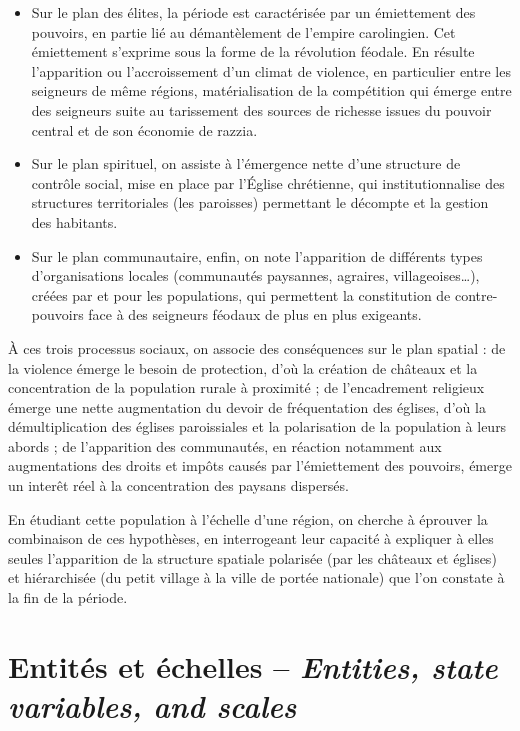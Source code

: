 \begin{itemize}
	\item Sur le plan des élites, la période est caractérisée par un émiettement des pouvoirs, en partie lié au démantèlement de l'empire carolingien.
	Cet émiettement s'exprime sous la forme de la \og révolution féodale\fg{}.
	En résulte l'apparition ou l'accroissement d'un climat de violence, en particulier entre les seigneurs de même régions, matérialisation de la compétition qui émerge entre des seigneurs suite au tarissement des sources de richesse issues du pouvoir central et de son économie de razzia.
	\item Sur le plan spirituel, on assiste à l'émergence nette d'une structure de contrôle social, mise en place par l'Église chrétienne, qui institutionnalise des structures territoriales (les paroisses) permettant le décompte et la gestion des habitants.
	\item Sur le plan communautaire, enfin, on note l'apparition de différents types d'organisations locales (communautés paysannes, agraires, villageoises\ldots), créées par et pour les populations, qui permettent la constitution de contre-pouvoirs face à des seigneurs féodaux de plus en plus exigeants.
\end{itemize}

À ces trois processus sociaux, on associe des conséquences sur le plan spatial : de la violence émerge le besoin de protection, d'où la création de châteaux et la concentration de la population rurale à proximité ; de l'encadrement religieux émerge une nette augmentation du devoir de fréquentation des églises, d'où la démultiplication des églises paroissiales et la polarisation de la population à leurs abords ; de l'apparition des communautés, en réaction notamment aux augmentations des droits et impôts causés par l'émiettement des pouvoirs, émerge un interêt réel à la concentration des paysans dispersés.

En étudiant cette population à l'échelle d'une région, on cherche à éprouver la combinaison de ces hypothèses, en interrogeant leur capacité à expliquer à elles seules l'apparition de la structure spatiale polarisée (par les châteaux et églises) et hiérarchisée (du petit village à la ville de portée nationale) que l'on constate à la fin de la période.

\let\orisectionmark\sectionmark
\renewcommand\sectionmark[1]{}%
\section[Entités et échelles -- \textit{Entities, state variables, and scales}]{Entités et échelles -- \large{\textit{Entities, state variables, and scales}}}
\orisectionmark{Entités et échelles}
\let\sectionmark\orisectionmark

